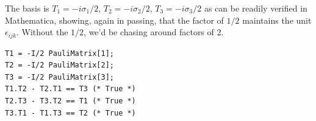 \noindent The basis is $T_1 = -i\sigma_1/2$, $T_2 = -i\sigma_2/2$, $T_3 = -i
\sigma_3/2$ as can be readily verified in Mathematica, showing, again in
passing, that the factor of $1/2$ maintains the unit  $\epsilon_{ijk}$. Without the $1/2$, we'd be chasing around factors of $2$. 

\begin{Verbatim}[frame=single, label=Mathematica]
T1 = -I/2 PauliMatrix[1];
T2 = -I/2 PauliMatrix[2];
T3 = -I/2 PauliMatrix[3];
T1.T2 - T2.T1 == T3 (* True *)
T2.T3 - T3.T2 == T1 (* True *)
T3.T1 - T1.T3 == T2 (* True *)
\end{Verbatim}
